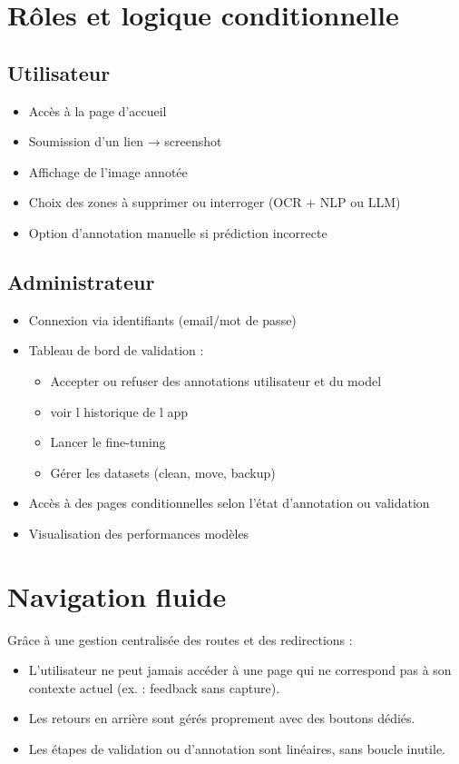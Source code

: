 \documentclass[12pt,a4paper]{report}
\begin{document}
\section{Rôles et logique conditionnelle}

\subsection{Utilisateur}

\begin{itemize}
\item Accès à la page d'accueil
\item Soumission d'un lien → screenshot
\item Affichage de l'image annotée
\item Choix des zones à supprimer ou interroger (OCR + NLP ou LLM)
\item Option d'annotation manuelle si prédiction incorrecte
\end{itemize}

\subsection{Administrateur}

\begin{itemize}
\item Connexion via identifiants (email/mot de passe)
\item Tableau de bord de validation :
\begin{itemize}
\item Accepter ou refuser des annotations utilisateur et du model
\item voir l historique de l app 
\item Lancer le fine-tuning
\item Gérer les datasets (clean, move, backup)
\end{itemize}
\item Accès à des pages conditionnelles selon l'état d'annotation ou validation
\item Visualisation des performances modèles
\end{itemize}

\section{Navigation fluide}

Grâce à une gestion centralisée des routes et des redirections :
\begin{itemize}
\item L'utilisateur ne peut jamais accéder à une page qui ne correspond pas à son contexte actuel (ex. : feedback sans capture).
\item Les retours en arrière sont gérés proprement avec des boutons dédiés.
\item Les étapes de validation ou d'annotation sont linéaires, sans boucle inutile.
\end{itemize}
\end{document}
